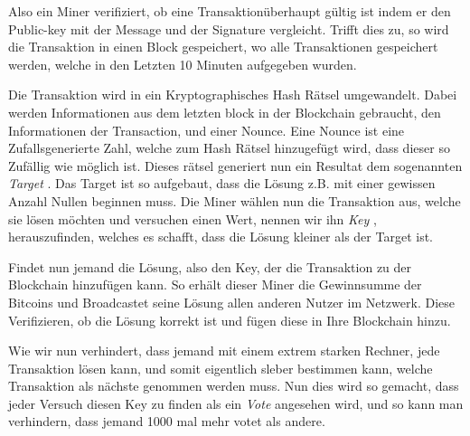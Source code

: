 \noindent
Also ein Miner verifiziert, ob eine Transaktionüberhaupt gültig ist indem er den Public-key mit der Message und der Signature vergleicht. Trifft dies zu, so wird die Transaktion in einen Block gespeichert,
wo alle Transaktionen gespeichert werden, welche in den Letzten 10 Minuten aufgegeben wurden.

\noindent
Die Transaktion wird in ein Kryptographisches Hash Rätsel umgewandelt. Dabei werden Informationen aus dem letzten block in der Blockchain gebraucht, den Informationen der Transaction, und einer Nounce.
Eine Nounce ist eine Zufallsgenerierte Zahl, welche zum Hash Rätsel hinzugefügt wird, dass dieser so Zufällig wie möglich ist. Dieses rätsel generiert nun ein Resultat dem sogenannten \emph{\dq Target \dq}.
Das Target ist so aufgebaut, dass die Lösung z.B. mit einer gewissen Anzahl Nullen beginnen muss. Die Miner wählen nun die Transaktion aus, welche sie lösen möchten und versuchen einen Wert, nennen wir ihn
\emph{\dq Key \dq}, herauszufinden, welches es schafft, dass die Lösung kleiner als der Target ist.

\noindent
Findet nun jemand die Lösung, also den Key, der die Transaktion zu der Blockchain hinzufügen kann. So erhält dieser Miner die Gewinnsumme der Bitcoins und Broadcastet seine Lösung allen anderen Nutzer im Netzwerk.
Diese Verifizieren, ob die Lösung korrekt ist und fügen diese in Ihre Blockchain hinzu.

\noindent
Wie wir nun verhindert, dass jemand mit einem extrem starken Rechner, jede Transaktion lösen kann, und somit eigentlich sleber bestimmen kann, welche Transaktion als nächste genommen werden muss.
Nun dies wird so gemacht, dass jeder Versuch diesen Key zu finden als ein \emph{\dq Vote \dq} angesehen wird, und so kann man verhindern, dass jemand 1000 mal mehr votet als andere.



\newpage
